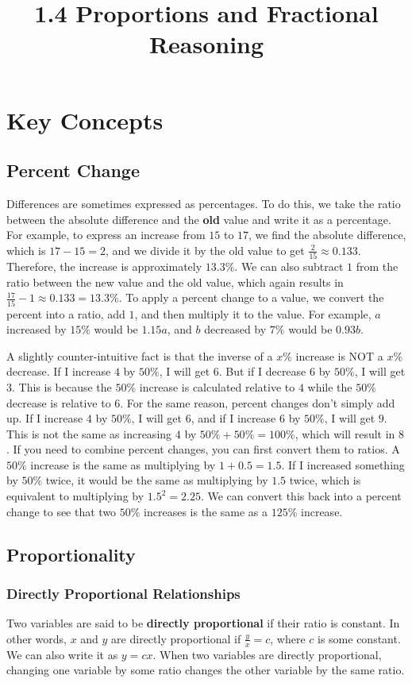 \documentclass{article}
\title{1.4 Proportions and Fractional Reasoning}
\author{}
\date{}
\begin{document}
\maketitle
\section*{Key Concepts}
\subsection*{Percent Change}
Differences are sometimes expressed as percentages. To do this, we take the
ratio between the absolute difference and the \textbf{old} value and write
it as a percentage. For example, to express an increase from $15$ to $17$,
we find the absolute difference, which is $17 - 15 = 2$, and we divide it by
the old value to get $\frac{2}{15} \approx 0.133$. Therefore, the increase
is approximately $13.3\%$. We can also subtract $1$ from the ratio between
the new value and the old value, which again results in $\frac{17}{15} - 1
\approx 0.133 = 13.3\%$. To apply a percent change to a value, we convert
the percent into a ratio, add $1$, and then multiply it to the value. For
example, $a$ increased by $15\%$ would be $1.15a$, and $b$ decreased by
$7\%$ would be $0.93b$.

A slightly counter-intuitive fact is that the inverse of a $x\%$ increase is
NOT a $x\%$ decrease. If I increase $4$ by $50\%$, I will get $6$. But if I
decrease $6$ by $50\%$, I will get $3$. This is because the $50\%$ increase
is calculated relative to $4$ while the $50\%$ decrease is relative to $6$.
For the same reason, percent changes don't simply add up. If I increase $4$
by $50\%$, I will get $6$, and if I increase $6$ by $50\%$, I will get $9$.
This is not the same as increasing $4$ by $50\% + 50\% = 100\%$, which will
result in $8$. If you need to combine percent changes, you can first convert
them to ratios. A $50\%$ increase is the same as multiplying by $1 + 0.5 =
1.5$. If I increased something by $50\%$ twice, it would be the same as
multiplying by $1.5$ twice, which is equivalent to multiplying by $1.5^2 =
2.25$. We can convert this back into a percent change to see that two $50\%$
increases is the same as a $125\%$ increase.

\subsection*{Proportionality}
\subsubsection*{Directly Proportional Relationships}
Two variables are said to be \textbf{directly proportional} if their ratio
is constant. In other words, $x$ and $y$ are directly proportional if
$\frac{y}{x} = c$, where $c$ is some constant. We can also write it as $y =
cx$. When two variables are directly proportional, changing one variable by
some ratio changes the other variable by the same ratio.
\end{document}
